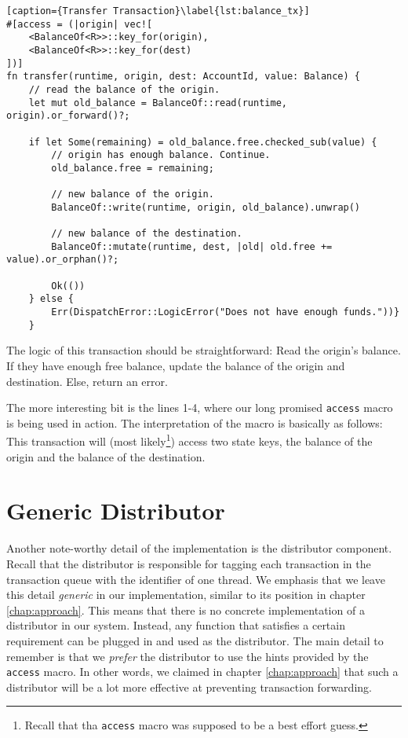 \begin{lstlisting}[caption={Transfer Transaction}\label{lst:balance_tx}]
#[access = (|origin| vec![
	<BalanceOf<R>>::key_for(origin),
	<BalanceOf<R>>::key_for(dest)
])]
fn transfer(runtime, origin, dest: AccountId, value: Balance) {
	// read the balance of the origin.
	let mut old_balance = BalanceOf::read(runtime, origin).or_forward()?;

	if let Some(remaining) = old_balance.free.checked_sub(value) {
		// origin has enough balance. Continue.
		old_balance.free = remaining;

		// new balance of the origin.
		BalanceOf::write(runtime, origin, old_balance).unwrap()

		// new balance of the destination.
		BalanceOf::mutate(runtime, dest, |old| old.free += value).or_orphan()?;

		Ok(())
	} else {
		Err(DispatchError::LogicError("Does not have enough funds."))}
	}
\end{lstlisting}

The logic of this transaction should be straightforward: Read the origin's balance. If they have
enough free balance, update the balance of the origin and destination. Else, return an error.

The more interesting bit is the lines 1-4, where our long promised \texttt{access} macro is being
used in action. The interpretation of the macro is basically as follows: This transaction will (most
likely\footnote{Recall that tha \texttt{access} macro was supposed to be a best effort guess.})
access two state keys, the balance of the origin and the balance of the destination.

\section{Generic Distributor}

Another note-worthy detail of the implementation is the distributor component. Recall that the
distributor is responsible for tagging each transaction in the transaction queue with the identifier
of one thread. We emphasis that we leave this detail \textit{generic} in our implementation, similar
to its position in chapter \ref{chap:approach}. This means that there is no concrete implementation
of a distributor in our system. Instead, any function that satisfies a certain requirement can be
plugged in and used as the distributor. The main detail to remember is that we \textit{prefer} the
distributor to use the hints provided by the \texttt{access} macro. In other words, we claimed in
chapter \ref{chap:approach} that such a distributor will be a lot more effective at preventing
transaction forwarding.

